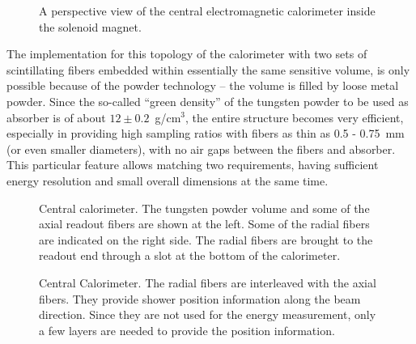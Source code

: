\begin{figure}[tb]
\vspace{8.0cm} 
\caption{\small{A perspective view of the central electromagnetic 
calorimeter inside the solenoid magnet.}}
\label{yrs1}
\end{figure}

The implementation for this topology of the calorimeter with two sets of 
scintillating fibers embedded within essentially the same sensitive volume,
is only possible because of the powder technology -- the volume is filled 
by loose metal powder. Since the so-called ``green density'' of the 
tungsten powder to be used as absorber is of about $12 \pm 0.2$~g/cm$^3$, 
the entire structure becomes very efficient, especially in providing high 
sampling ratios with fibers as thin as 0.5 - 0.75~mm (or even smaller 
diameters), with no air gaps between the fibers and absorber.  This 
particular feature allows matching two requirements, having sufficient 
energy resolution and small overall dimensions at the same time.

\begin{figure}
\vspace{6.7cm} 
\caption{\small{Central calorimeter. The tungsten powder volume and some of 
the axial readout fibers are shown at the left.  Some of the radial fibers 
are indicated on the right side.  The radial fibers are brought to the 
readout end through a slot at the bottom of the calorimeter.}}
\label{yrs2}
\end{figure}

\begin{figure}
\vspace{7.8cm} 
\caption{\small{Central Calorimeter. The radial fibers are interleaved with 
the axial fibers. They provide shower position information along the beam 
direction. Since they are not used for the energy measurement, only a few 
layers are needed to provide the position information.}}
\label{yrs3}
\end{figure}

